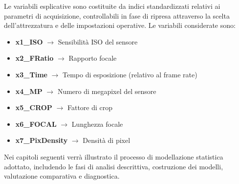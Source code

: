 Le variabili esplicative sono costituite da indici standardizzati relativi ai parametri di acquisizione, controllabili in fase di ripresa attraverso la scelta dell'attrezzatura e delle impostazioni operative. Le variabili considerate sono:

\begin{itemize}
    \item \textbf{x1\_ISO} \quad $\rightarrow$ \quad Sensibilità ISO del sensore
    \item \textbf{x2\_FRatio} \quad $\rightarrow$ \quad Rapporto focale
    \item \textbf{x3\_Time} \quad $\rightarrow$ \quad Tempo di esposizione (relativo al frame rate)
    \item \textbf{x4\_MP} \quad $\rightarrow$ \quad Numero di megapixel del sensore
    \item \textbf{x5\_CROP} \quad $\rightarrow$ \quad Fattore di crop
    \item \textbf{x6\_FOCAL} \quad $\rightarrow$ \quad Lunghezza focale
    \item \textbf{x7\_PixDensity} \quad $\rightarrow$ \quad Densità di pixel
\end{itemize}

\noindent Nei capitoli seguenti verrà illustrato il processo di modellazione statistica adottato, includendo le fasi di analisi descrittiva, costruzione dei modelli, valutazione comparativa e diagnostica.

